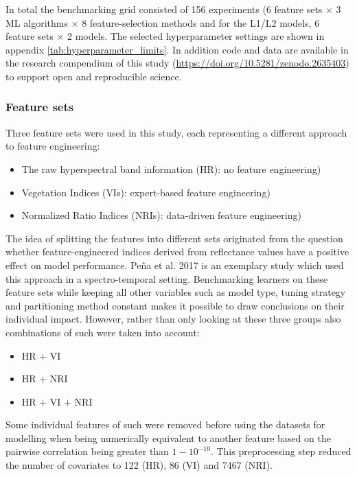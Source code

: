 \documentclass[remotesensing,article,submit,moreauthors,pdftex]{Definitions/mdpi}
\begin{document}
In total the benchmarking grid consisted of 156 experiments (6 feature sets $\times$ 3 ML algorithms $\times$ 8 feature-selection methods and for the L1/L2 models, 6 feature sets $\times$ 2 models.
The selected hyperparameter settings are shown in appendix \autoref{tab:hyperparameter_limits}.
In addition code and data are available in the research compendium of this study (\url{https://doi.org/10.5281/zenodo.2635403}) to support open and reproducible science.

\subsubsection{Feature sets}

Three feature sets were used in this study, each representing a different approach to feature engineering:

\begin{itemize}
	\item The raw hyperspectral band information (HR): no feature engineering) %
	\item Vegetation Indices (\ac{VI}s): expert-based feature engineering)
	\item Normalized Ratio Indices (\ac{NRI}s): data-driven feature engineering)
\end{itemize}

The idea of splitting the features into different sets originated from the question whether feature-engineered indices derived from reflectance values have a positive effect on model performance.
Peña et al. 2017 \cite{pena2017} is an exemplary study which used this approach in a spectro-temporal setting.
Benchmarking learners on these feature sets while keeping all other variables such as model type, tuning strategy and partitioning method constant makes it possible to draw conclusions on their individual impact.
However, rather than only looking at these three groups also combinations of such were taken into account:

\begin{itemize}
	\item HR + VI %
	\item HR + NRI
	\item HR + VI + NRI
\end{itemize}

Some individual features of such were removed before using the datasets for modelling when being numerically equivalent to another feature based on the pairwise correlation being greater than $1 - 10^{-10}$.
This preprocessing step reduced the number of covariates to 122 (HR), 86 (VI) and 7467 (NRI).
\end{document}
